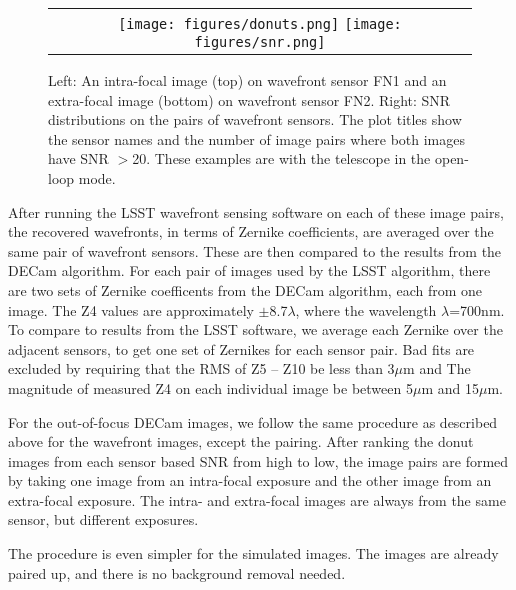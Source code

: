 \documentclass[]{spie}  %
\begin{document}
   \begin{figure} [tphb]
   \begin{center}
   \begin{tabular}{c} %
   \texttt{[image: figures/donuts.png]}
   \texttt{[image: figures/snr.png]}
   \end{tabular}
   \end{center}
   \caption[example] 
   { \label{fig:approach} 
Left: An intra-focal image (top) on wavefront sensor FN1 and an 
extra-focal image (bottom) on wavefront sensor FN2.
Right: SNR distributions on the pairs of wavefront sensors. The plot titles show the sensor names and the number of image pairs where both images have SNR $>$20.
These examples are with the telescope in the open-loop mode.
}
   \end{figure} 

After running the LSST wavefront sensing software on each of these image pairs, the recovered wavefronts, in terms of Zernike coefficients, are averaged over the same pair of wavefront sensors.
These are then compared to the results from the DECam algorithm.
For each pair of images used by the LSST algorithm, there are two sets of Zernike coefficents from the DECam algorithm, each from one image.
The Z4 values are approximately $\pm$8.7$\lambda$, where the wavelength $\lambda$=700nm.
To compare to results from the LSST software, we average each Zernike over the adjacent sensors, to get one set of Zernikes for each sensor pair.
Bad fits are excluded by requiring that the RMS of Z5 -- Z10 be less than 3$\mu$m and The magnitude of measured Z4 on each individual image be between 5$\mu$m and 15$\mu$m.

For the out-of-focus DECam images, we follow the same procedure as described above for the wavefront images, except the pairing.
After ranking the donut images from each sensor based SNR from high to low, the image pairs are formed by taking one image from an intra-focal exposure and the other image from an extra-focal exposure.
The intra- and extra-focal images are always from the same sensor, but different exposures.

The procedure is even simpler for the simulated images. The images are already paired up, and there is no background removal needed.
\end{document}
